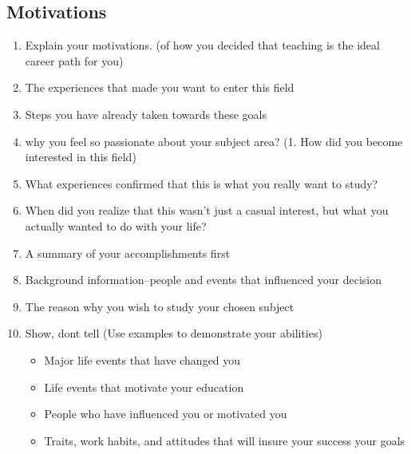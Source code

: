 \documentclass[a4paper,12pt]{article}%
\begin{document}
\subsection{Motivations}
\label{sec:Motivations}
\begin{enumerate}
	\item Explain your motivations.  (of how you decided that teaching is the ideal career path for you) \\
		\item The experiences that made you want to enter this field
		\item Steps you have already taken towards these goals   
		\item why you feel so passionate about your subject area?  (1.	How did you become interested in this field)  \\
			  \hrulefill
			  
	  \hrulefill
	  
		\item	What experiences confirmed that this is what you really want to study?
	\item	When did you realize that this wasn't just a casual interest, but what you actually wanted to do with your life?
			\item	A summary of your accomplishments first
				\item Background information--people and events that influenced your decision
 	\item 		The reason why you wish to study your chosen subject\\
 		  \hrulefill
 		  
	  \hrulefill
	  
 	\item Show, dont tell (Use examples to demonstrate your abilities)
\begin{itemize}
	\item Major life events that have changed you
	\item Life events that motivate your education
	\item People who have influenced you or motivated you 
	\item Traits, work habits, and attitudes that will insure your success your goals
\end{itemize}
 		  \hrulefill	
 		   
	  \hrulefill
	  

\end{enumerate}
\end{document}
